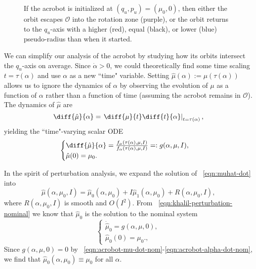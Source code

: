 \begin{figure}
    \centering 
    \caption{If the acrobot is initialized at \((q_u,p_u) = (\mu_0,0)\), then
        either the orbit escapes \(\mathcal{O}\) into the rotation
        zone (purple), or the orbit returns to the \(q_u\)-axis 
        with a higher (red), equal (black), or lower (blue) pseudo-radius than when it
        started.}
    \label{fig:acrobot-possible-orbits}
\end{figure}

We can simplify our analysis of the acrobot by studying how its orbits
intersect the \(q_u\)-axis on average.
Since \(\dot{\alpha} > 0\), we could theoretically find some time scaling 
\(t = \tau(\alpha)\) and use \(\alpha\) as a new ``time" variable.
Setting \(\hat{\mu}(\alpha) := \mu(\tau(\alpha))\) allows us to ignore the
dynamics of \(\alpha\) by observing the evolution of \(\mu\) as a function of
\(\alpha\) rather than a function of time (assuming the acrobot remains in
\(\mathcal{O}\)).
The dynamics of \(\hat{\mu}\) are
\[
    \diff{\hat{\mu}}{\alpha} = 
    \left.\diff{\mu}{t} \diff{t}{\alpha} \right|_{t =\tau(\alpha)}
    ,
\] 
yielding the ``time"-varying scalar ODE
\begin{equation}\label{eqn:muhat-dot}
    \begin{cases}
        \diff{\hat{\mu}}{\alpha} 
        = \frac{f_\mu(\tau(\alpha),\mu,I)}{f_\alpha(\tau(\alpha),\mu,I)}
        =: g(\alpha,\mu,I)
        , \\
        \hat{\mu}(0) = \mu_0
        .
    \end{cases}
\end{equation}

In the spirit of perturbation analysis, we expand the solution of
~\eqref{eqn:muhat-dot} into
\begin{equation}\label{eqn:acrobot-muhat-approx}
    \hat{\mu}(\alpha,\mu_0,I) = \hat{\mu}_0(\alpha,\mu_0) + I
    \hat{\mu}_1(\alpha,\mu_0)
    + R(\alpha,\mu_0,I)
    ,
\end{equation}
where \(R(\alpha,\mu_0,I)\) is smooth and \(O(I^2)\).
From ~\eqref{eqn:khalil-perturbation-nominal} we know that 
\(\hat{\mu}_0\) is the solution to the nominal system
\[
\begin{cases}
    \dot{\hat{\mu}}_0 = g(\alpha,\mu,0)
    , \\
    \hat{\mu}_0(0) = \mu_0
   .,
\end{cases}
\]
Since \(g(\alpha,\mu,0) = 0\) by 
~\eqref{eqn:acrobot-mu-dot-nom}-\eqref{eqn:acrobot-alpha-dot-nom}, we find that
\(\hat{\mu}_0(\alpha,\mu_0) \equiv \mu_0\) for all \(\alpha\).

